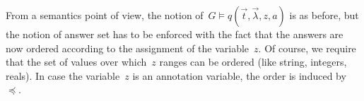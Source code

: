\nd From a semantics point of view, the notion of~$G \models q(\vec{t},\vec{\lambda}, z, a)$ is as before, but the
notion of answer set has to be enforced with the fact that the answers are now ordered according to the assignment of
the variable~$z$. Of course, we require that the set of values over which~$z$ ranges can be ordered (like string,
integers, reals).
%
In case the variable~$z$ is an annotation variable, the order is induced by~$\preceq$.  



